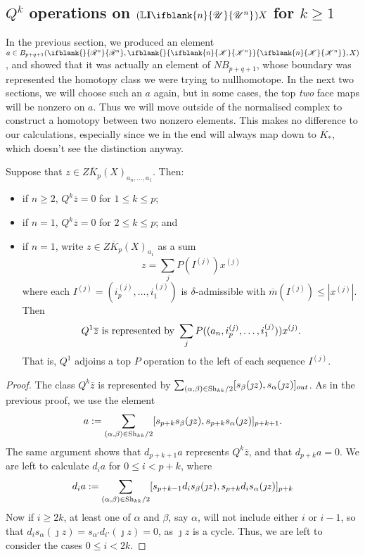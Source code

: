 \documentclass[10pt]{article}
\newcommand{\PRLie}[1]{\scrR^{#1}}%
\newcommand{\LL}[1]{\ifblank{#1}{\scrK}{\scrK^{#1}}}
\newcommand{\nontop}[1]{\ifblank{#1}{\scrU}{\scrU^{#1}}}
\newcommand{\Ind}[2][]{\mathbf{I}{#2}_{#1}}%
\newcommand{\Fr}[2][]{\ifblank{#1}{#2}{#2_{#1}}}
\newcommand{\derived}{\mathbb{L}}
\renewcommand{\Q}{Q}
\newcommand{\minDimP}{\overline{m}}
\newcommand{\HalfShuffles}[2]{\textup{Sh}_{#1#2}/2}
\begin{document}
\begin{LieLambdaStructureOnKoszul}
\subsection{$\Q^k$ operations on $(\derived\Ind{\nontop{n}})X$ for $k\geq1$}
In the previous section, we produced an element $a\in B_{p+q+1}(\Fr{\PRLie{n}},\Fr{\LL{n}},X)$, and showed that it was actually an element of $NB_{p+q+1}$, whose boundary was represented the homotopy class we were trying to nullhomotope. In the next two sections, we will choose such an $a$ again, but in some cases, the top \emph{two} face maps will be nonzero on $a$. Thus we will move outside of the normalised complex to construct a homotopy between two nonzero elements. This makes no difference to our calculations, especially since we in the end will always map down to $\overline{K}_*$, which doesn't see the distinction anyway.
\begin{prop}
Suppose that $z\in Z\overline{K}_p(X)_{a_n,\ldots,a_1}$. Then:
\begin{itemize}\squishlist
\setlength{\parindent}{.25in}
\item  if $n\geq2$, $\Q^k\overline{z}=0$ for $1\leq k\leq p$;
\item  if $n=1$, $\Q^k\overline{z}=0$ for $2\leq k\leq p$; and
\item if $n=1$, write $z\in Z\overline{K}_p(X)_{a_1}$ as a sum 
\[z=\sum_{j}P(I^{(j)})x^{(j)}\]
where each $I^{(j)}=(i_p^{(j)},\ldots,i_1^{(j)})$ is $\delta$-admissible with $\minDimP(I^{(j)})\leq |x^{(j)}|$. Then
\[\Q^1\overline{z}\textup{ is represented by }\sum_{j}P((a_{n},i_p^{(j)},\ldots,i_1^{(j)}))x^{(j)}.\]
That is, $\Q^1$ adjoins a top $P$ operation to the left of each sequence $I^{(j)}$.
\end{itemize}
\end{prop}
\begin{proof}
The class $\Q^k\overline{z}$ is represented by $\sum_{(\alpha,\beta)\in\HalfShuffles{k}{k}}[s_\beta(\jmath z), s_\alpha(\jmath z)]_{out}$. As in the previous proof, we use the element
\[a:=\sum_{(\alpha,\beta)\in\HalfShuffles{k}{k}}[s_{p+k}s_\beta(\jmath z), s_{p+k}s_\alpha(\jmath z)]_{p+k+1}.\]
The same argument shows that $d_{p+k+1}a$ represents $\Q^k\overline{z}$, and that $d_{p+k}a=0$. We are left to calculate $d_ia$ for $0\leq i<p+k$, where 
\[d_ia:=\sum_{(\alpha,\beta)\in\HalfShuffles{k}{k}}[s_{p+k-1}d_is_\beta(\jmath z), s_{p+k}d_is_\alpha(\jmath z)]_{p+k}\]
Now if $i\geq 2k$, at least one of $\alpha$ and $\beta$, say $\alpha$, will not include either $i$ or $i-1$, so that $d_is_\alpha(\jmath z)=s_{\alpha'}d_{i'}(\jmath z)=0$, as $\jmath z$ is a cycle. Thus, we are left to consider the cases $0\leq i< 2k$.


\end{proof}
\end{LieLambdaStructureOnKoszul}
\end{document}
